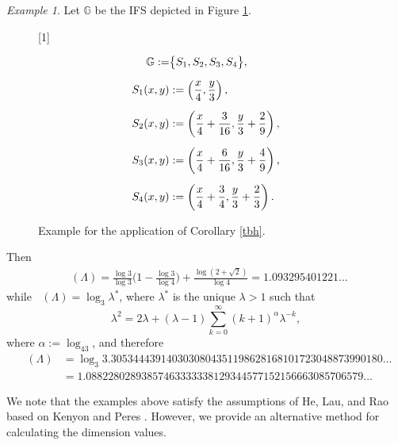 \documentclass[a4paper, 11pt]{article}
\DeclareMathOperator{\dH}{\dim_{\mathrm{H}}}
\DeclareMathOperator{\dB}{\dim_{\mathrm{B}}}
\numberwithin{equation}{section}
\theoremstyle{plain}
\theoremstyle{remark}
\newtheorem{example}[theorem]{Example}
\theoremstyle{definition}
\begin{document}
\begin{example} \label{ex:2}
Let $\mathbb{G}$ be the IFS depicted in Figure \ref{EF1}.

\begin{figure}[H]
	\centering
	\begin{minipage}{0.65\textwidth}
		\centering
		\scalebox{1}[1]{}
	\end{minipage}%
	\hfill
	\begin{minipage}{0.35\textwidth}
		\raggedright
		\begin{align*}
			\mathbb{G} := &\big\{S_1, S_2, S_3, S_4 \big\}, \notag\\[6pt]
			S_1(x,y) &:= \left(\frac{x}{4},\frac{y}{3}\right), \notag\\[5pt]
			S_2(x,y) &:= \left(\frac{x}{4}+\frac{3}{16},\frac{y}{3}+\frac29\right), \notag\\[5pt]
			S_3(x,y) &:= \left(\frac{x}{4}+\frac{6}{16},\frac{y}{3}+\frac49\right), \notag\\[5pt]
			S_4(x,y) &:= \left(\frac{x}{4}+\frac34,\frac{y}{3}+\frac23\right). \notag
		\end{align*}
	\end{minipage}
	\caption{Example for the application of Corollary \ref{tbh}.}
	\label{EF1}
\end{figure}

Then
\begin{align*}
\dB(\Lambda) = \frac{\log 3}{\log 3}\Big(1 - \frac{\log 3}{\log 4}\Big) + \frac{\log(2+\sqrt{2})}{\log 4} = 1.093295401221 \dots
\end{align*}
while $\dH(\Lambda) = \log_3 \lambda^*$, where $\lambda^*$ is the unique $\lambda> 1$ such that
\begin{equation*}
\lambda^2 = 2\lambda + (\lambda-1)\sum_{k=0}^\infty (k+1)^\alpha \lambda^{-k},
\end{equation*}
where $\alpha := \log_43$, and therefore
\begin{align*}
\dH(\Lambda) &= \log_3 3.3053444391403030804351198628168101723048873990180\dots \\
& = 1.08822802893857463333338129344577152156663085706579\dots
\end{align*}

\end{example}

We note that the examples above satisfy the assumptions of He, Lau, and Rao \cite[Theorem~4.4]{He2003} based on Kenyon and Peres \cite[Theorem~2.2]{Kenyon1996}. However, we provide an alternative method for calculating the dimension values.
\end{document}
